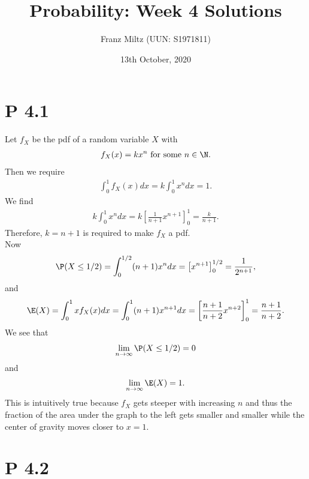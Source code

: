 \documentclass{article}
\begin{document}
\title{Probability: Week 4 Solutions}
\author{Franz Miltz (UUN: S1971811)}
\date{13th October, 2020}
\maketitle


\section*{P 4.1}


Let $f_X$ be the pdf of a random variable $X$ with
\begin{align*}
	f_X(x) = k x^n \text{ for some } n\in\N.
\end{align*}
Then we require
\begin{align*}
	\int_0^1 f_X(x) dx = k\int_0^1 x^n dx = 1.
\end{align*}
We find
\begin{align*}
	k\int_0^1 x^n dx = k\left[\frac{1}{n+1}x^{n+1}\right]_0^1 = \frac{k}{n+1}.
\end{align*}
Therefore, $k=n+1$ is required to make $f_X$ a pdf.\\
Now
\begin{align*}
	\P(X\leq 1/2) = \int_0^{1/2} (n+1)x^n dx = \left[x^{n+1}\right]_0^{1/2}
	=\frac{1}{2^{n+1}},
\end{align*}
and
\begin{align*}
	\E(X) = \int_0^1 x f_X(x) dx = \int_0^1 (n+1)x^{n+1} dx
	= \left[\frac{n+1}{n+2}x^{n+2}\right]_0^1 = \frac{n+1}{n+2}.
\end{align*}
We see that
\begin{align*}
	\lim_{n\to\infty} \P(X\leq 1/2) = 0
\end{align*}
and
\begin{align*}
	\lim_{n\to\infty} \E(X) = 1.
\end{align*}
This is intuitively true because $f_X$ gets steeper with increasing
$n$ and thus the fraction of the area under the graph to the left
gets smaller and smaller while the center of gravity moves closer to
$x=1$.


\section*{P 4.2}
\end{document}
